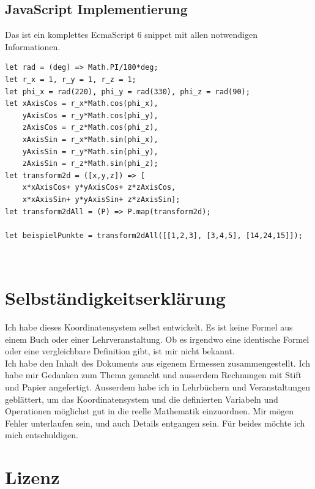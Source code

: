 \documentclass[a4paper]{article}
\begin{document}
\subsection{JavaScript Implementierung}

\begin{example}
Das ist ein komplettes EcmaScript 6 snippet mit allen notwendigen Informationen.\\
\begin{lstlisting}
let rad = (deg) => Math.PI/180*deg;
let r_x = 1, r_y = 1, r_z = 1; 
let phi_x = rad(220), phi_y = rad(330), phi_z = rad(90); 
let xAxisCos = r_x*Math.cos(phi_x), 
    yAxisCos = r_y*Math.cos(phi_y),
    zAxisCos = r_z*Math.cos(phi_z),
    xAxisSin = r_x*Math.sin(phi_x), 
    yAxisSin = r_y*Math.sin(phi_y),
    zAxisSin = r_z*Math.sin(phi_z);
let transform2d = ([x,y,z]) => [
    x*xAxisCos+ y*yAxisCos+ z*zAxisCos,
    x*xAxisSin+ y*yAxisSin+ z*zAxisSin];
let transform2dAll = (P) => P.map(transform2d);

let beispielPunkte = transform2dAll([[1,2,3], [3,4,5], [14,24,15]]);
\end{lstlisting}
\end{example}\\


\section{Selbst\"andigkeitserkl\"arung}

Ich habe dieses Koordinatensystem selbst entwickelt. Es ist keine Formel aus einem Buch oder einer Lehrveranstaltung.
Ob es irgendwo eine identische Formel oder eine vergleichbare Definition gibt, ist mir nicht bekannt.\\

Ich habe den Inhalt des Dokuments aus eigenem Ermessen zusammengestellt. Ich habe mir Gedanken zum Thema gemacht und
ausserdem Rechnungen mit Stift und Papier angefertigt. Ausserdem habe ich in Lehrb\"uchern und Veranstaltungen gebl\"attert,
um das Koordinatensystem und die definierten Variabeln und Operationen m\"oglichst gut in die reelle Mathematik einzuordnen.
Mir m\"ogen Fehler unterlaufen sein, und auch Details entgangen sein. F\"ur beides m\"ochte ich mich entschuldigen.\\


\section{Lizenz}
\end{document}
